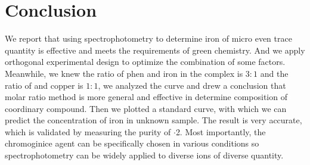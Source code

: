 \section{Conclusion}
We report that using spectrophotometry to determine iron of micro even trace quantity is effective and meets the requirements of green chemistry. And we apply orthogonal experimental design to optimize the combination of some factors. Meanwhile, we knew the ratio of phen and iron in the complex is $3:1$ and the ratio of  and copper is $1:1$, we analyzed the curve and drew a conclusion that molar ratio method is more general and effective in determine composition of coordinary compound. Then we plotted a standard curve, with which we can predict the concentration of iron in unknown sample. The result is very accurate, which is validated by measuring the purity of $\cdot$2. Most importantly, the chromoginice agent can be specifically chosen in various conditions so spectrophotometry can be widely applied to diverse ions of diverse quantity.